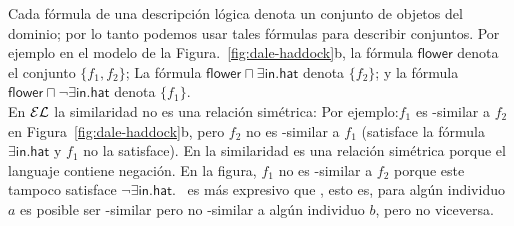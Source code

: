 Cada f\'ormula de una descripci\'on l\'ogica denota un conjunto de objetos del dominio; por lo tanto podemos usar tales f\'ormulas para describir conjuntos. Por ejemplo en el modelo de la Figura.~\ref{fig:dale-haddock}b, la f\'ormula
$\mathsf{flower}$ denota el conjunto $\{f_1,f_2\}$; La f\'ormula
$\mathsf{flower} \sqcap \exists \mathsf{in}.\mathsf{hat}$ denota
$\{f_2\}$; y la f\'ormula $\mathsf{flower} \sqcap \neg
\exists \mathsf{in}.\mathsf{hat}$ denota $\{f_1\}$.\\

En $\mathcal{EL}$ la similaridad no es una relaci\'on sim\'etrica: Por ejemplo:$f_1$ es \el-similar a $f_2$ en
Figura~\ref{fig:dale-haddock}b, pero $f_2$ no es \el-similar a $f_1$
(satisface la f\'ormula $\exists \mathsf{in}.\mathsf{hat}$ y $f_1$
no la satisface). En \alc la similaridad es una relaci\'on sim\'etrica porque
el languaje contiene negaci\'on. En la figura, $f_1$ no es \alc-similar
a $f_2$ porque este tampoco satisface $\neg \exists
\mathsf{in}.\mathsf{hat}$. \alc\ es m\'as expresivo que \el,
esto es, para alg\'un individuo $a$ es posible ser \el-similar pero
no \alc-similar a alg\'un individuo $b$, pero no viceversa.





